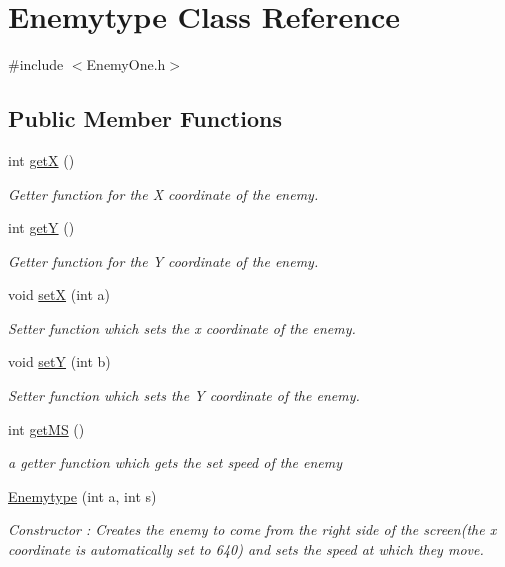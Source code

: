 \hypertarget{classEnemytype}{
\section{Enemytype Class Reference}
\label{classEnemytype}
}


{\ttfamily \#include $<$EnemyOne.h$>$}\subsection*{Public Member Functions}
\begin{DoxyCompactItemize}
\item 
int \hyperlink{classEnemytype_a641488fb71b330a7104abe92acd0601a}{getX} ()
\begin{DoxyCompactList}\small\item\em Getter function for the X coordinate of the enemy. \item\end{DoxyCompactList}\item 
int \hyperlink{classEnemytype_aca1ceba65fea5f547abcfaa957c7e5ce}{getY} ()
\begin{DoxyCompactList}\small\item\em Getter function for the Y coordinate of the enemy. \item\end{DoxyCompactList}\item 
void \hyperlink{classEnemytype_a19472039711c84c97ef8d11921b9e510}{setX} (int a)
\begin{DoxyCompactList}\small\item\em Setter function which sets the x coordinate of the enemy. \item\end{DoxyCompactList}\item 
void \hyperlink{classEnemytype_a873a843e7f6eba7dd8ef41d4041661f6}{setY} (int b)
\begin{DoxyCompactList}\small\item\em Setter function which sets the Y coordinate of the enemy. \item\end{DoxyCompactList}\item 
int \hyperlink{classEnemytype_adc3cce767c80a8dee47acd0e48691ac3}{getMS} ()
\begin{DoxyCompactList}\small\item\em a getter function which gets the set speed of the enemy \item\end{DoxyCompactList}\item 
\hyperlink{classEnemytype_a315e220bfb4ffe6c67f31ac57b015679}{Enemytype} (int a, int s)
\begin{DoxyCompactList}\small\item\em Constructor : Creates the enemy to come from the right side of the screen(the x coordinate is automatically set to 640) and sets the speed at which they move. \item\end{DoxyCompactList}\end{DoxyCompactItemize}
